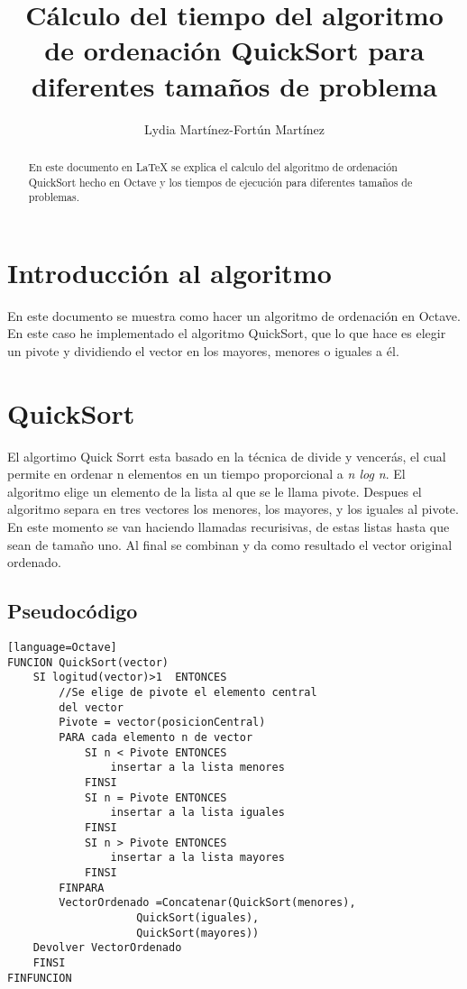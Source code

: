 \documentclass[a4,12pt]{article}
\title{Cálculo del tiempo del algoritmo de ordenación QuickSort para diferentes tamaños de problema}
\author{Lydia Martínez-Fortún Martínez}
\begin{document}
\maketitle



\begin{abstract}
En este documento en \LaTeX{} se explica el calculo del algoritmo de ordenación QuickSort hecho en Octave y los tiempos de ejecución para diferentes tamaños de problemas.
\end{abstract}

\tableofcontents

\newpage

\section{Introducción al algoritmo}

En este documento se muestra como hacer un algoritmo de ordenación en Octave. En este caso he implementado el algoritmo QuickSort, que lo que hace es elegir un pivote y dividiendo el vector en los mayores, menores o iguales a él.



\section{QuickSort}

El algortimo Quick Sorrt esta basado en la técnica de divide y vencerás, el cual permite en ordenar n elementos en un tiempo proporcional a \emph{n log n}. El algoritmo elige un elemento de la lista al que se le llama pivote. Despues el algoritmo separa en tres vectores los menores, los mayores, y los iguales al pivote. En este momento se van haciendo llamadas recurisivas, de estas listas hasta que sean de tamaño uno. Al final se combinan y da como resultado el vector original ordenado.


\subsection{Pseudocódigo}
\lstset{language=Pascal}
\begin{lstlisting}[frame=single][language=Octave]
FUNCION QuickSort(vector)
	SI logitud(vector)>1  ENTONCES
		//Se elige de pivote el elemento central 
		del vector
		Pivote = vector(posicionCentral)
		PARA cada elemento n de vector
			SI n < Pivote ENTONCES
				insertar a la lista menores
			FINSI
			SI n = Pivote ENTONCES
				insertar a la lista iguales
			FINSI
			SI n > Pivote ENTONCES
				insertar a la lista mayores
			FINSI
		FINPARA
		VectorOrdenado =Concatenar(QuickSort(menores), 
					QuickSort(iguales), 
					QuickSort(mayores))	
	Devolver VectorOrdenado	
	FINSI
FINFUNCION

\end{lstlisting}
\end{document}
